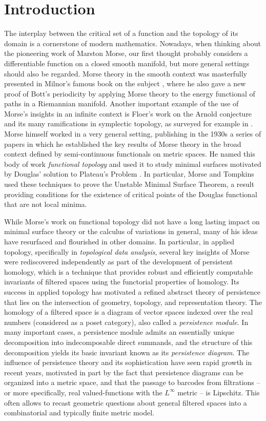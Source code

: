 
\section{Introduction}

The interplay between the critical set of a function and the topology of its domain is a cornerstone of modern mathematics.
Nowadays, when thinking about the pioneering work of Marston Morse, our first thought probably considers a differentiable function on a closed smooth manifold, but more general settings should also be regarded.
Morse theory in the smooth context was masterfully presented in Milnor's famous book on the subject \cite{MR0163331}, where he also gave a new proof of Bott's periodicity by applying Morse theory to the energy functional of paths in a Riemannian manifold.
Another important example of the use of Morse's insights in an infinite context is Floer's work on the Arnold conjecture and its many ramifications in symplectic topology, as surveyed for example in \cite{MR1702944}.
Morse himself worked in a very general setting, publishing in the 1930s a series of papers \cite{Morse.1937, Morse.1938, Morse.1940, MR9102} in which he established the key results of Morse theory in the broad context defined by semi-continuous functionals on metric spaces.
He named this body of work \emph{functional topology} and used it to study minimal surfaces motivated by Douglas' solution to Plateau’s Problem \cite{Douglas.1931}.
In particular, Morse and Tompkins \cite{Morse.1939, Morse.1941} used these techniques to prove the Unstable Minimal Surface Theorem, a result providing conditions for the existence of critical points of the Douglas functional that are not local minima.

While Morse's work on functional topology did not have a long lasting impact on minimal surface theory or the calculus of variations in general, many of his ideas have resurfaced and flourished in other domains.
In particular, in applied topology, specifically in \emph{topological data analysis}, several key insights of Morse were rediscovered independently as part of the development of persistent homology, which is
a technique that provides robust and efficiently computable invariants of filtered spaces using the functorial properties of homology.
Its success in applied topology has motivated a refined abstract theory of persistence that lies on the intersection of geometry, topology, and representation theory.
The homology of a filtered space is a diagram of vector spaces indexed over the real numbers (considered as a poset category), also called a \emph{persistence module}.
In many important cases, a persistence module admits an essentially unique decomposition into indecomposable direct summands, and the structure of this decomposition yields its basic invariant known as its \emph{persistence diagram}.
The influence of persistence theory and its sophistication have seen rapid growth in recent years, motivated in part by the fact that persistence diagrams can be organized into a metric space, and that the passage to barcodes from filtrations -- or more specifically, real valued-functions with the $L^\infty$ metric -- is Lipschitz.
This often allows to recast geometric questions about general filtered spaces into a combinatorial and typically finite metric model.

